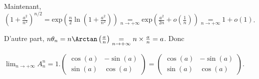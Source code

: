 {{Maintenant, $\left(1+ \frac{a^2}{n^2}\right)^{n/2}=\text{exp}\left( \frac{n}{2}\ln\left(1+ \frac{a^2}{n^2}\right)\right)\underset{n\rightarrow+\infty}{=}\text{exp}\left( \frac{a^2}{2n}+o\left( \frac{1}{n}\right)\right)\underset{n\rightarrow+\infty}{=}1+o(1)$.

D'autre part, $n\theta_n=n\Arctan\left( \frac{a}{n}\right)\underset{n\rightarrow+\infty}{=}n\times \frac{a}{n}=a$. Donc

\begin{center}
$\lim_{n \rightarrow +\infty}A_n^n=1.\left(
\begin{array}{cc}
\cos(a)&-\sin(a)\\
\sin(a)&\cos(a)
\end{array}
\right)=\left(
\begin{array}{cc}
\cos(a)&-\sin(a)\\
\sin(a)&\cos(a)
\end{array}
\right)$.
\end{center}

\begin{center}
\end{center}
}
}
